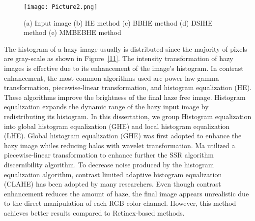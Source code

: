 \documentclass[doctor,english,listoffigures,listoftables]{thesis-uestc}
\begin{document}
\begin{figure}[H]
	\centering
	\texttt{[image: Picture2.png]}
	\caption{(a) Input image (b) HE method (c) BBHE method (d) DSIHE method (e) MMBEBHE method}
	\label{fig89}
\end{figure}

The histogram of a hazy image usually is distributed since the majority of pixels are gray-scale as shown in  Figure~\ref{11}. The intensity transformation of hazy images is effective due to its enhancement of the image's histogram. In contrast enhancement, the most common algorithms used are power-law gamma transformation, piecewise-linear transformation, and histogram equalization (HE). These algorithms improve the brightness of the final haze free image. Histogram equalization expands the dynamic range of the hazy input image by redistributing its histogram. In this dissertation, we group Histogram equalization into global histogram equalization (GHE) and local histogram equalization (LHE). Global histogram equalization (GHE) was first adopted to enhance the hazy image whiles reducing halos with wavelet transformation. Ma utilized a piecewise-linear transformation to enhance further the SSR algorithm discernibility algorithm. To decrease noise produced by the histogram equalization algorithm, contrast limited adaptive histogram equalization (CLAHE) has been adopted by many researchers. Even though contrast enhancement reduces the amount of haze, the final image appears unrealistic due to the direct manipulation of each RGB color channel. However, this method achieves better results compared to Retinex-based methods. 
\end{document}
